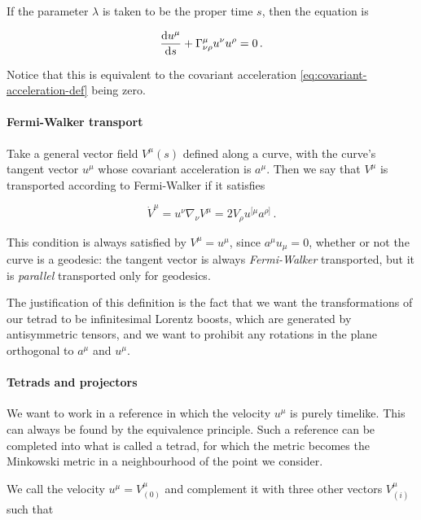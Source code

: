 \documentclass[main.tex]{subfiles}
\begin{document}
If the parameter $\lambda$ is taken to be the proper time $s$, then the equation is

\begin{equation}
    \dv{u^\mu}{s} + \Gamma^\mu _{\nu\rho} u^\nu u^\rho = 0 \,.
\end{equation}

Notice that this is equivalent to the covariant acceleration \eqref{eq:covariant-acceleration-def} being zero.

\paragraph{Fermi-Walker transport}

Take a general vector field \(V ^{\mu} (s)\) defined along a curve, with the curve's tangent vector \(u^\mu\) whose covariant acceleration is \(a^\mu\).
Then we say that \(V^\mu\) is transported according to Fermi-Walker if it satisfies

\begin{equation} \label{eq:fermi-walker-transport}
    \dot{V}^\mu  = u^\nu \nabla_\nu V^\mu
    = 2 V_\rho u^{[\mu} a^{\rho]} \,.
\end{equation}

This condition is always satisfied by \(V^\mu = u^\mu\), since \(a^\mu u_\mu = 0\), whether or not the curve is a geodesic: the tangent vector is always \emph{Fermi-Walker} transported, but it is \emph{parallel} transported only for geodesics.

The justification of this definition is the fact that we want the transformations of our tetrad to be infinitesimal Lorentz boosts, which are generated by antisymmetric tensors, and we want to prohibit any rotations in the plane orthogonal to \(a^\mu\) and \(u^\mu\).

\paragraph{Tetrads and projectors} \label{par:tetrads}

We want to work in a reference in which the velocity $u^\mu$ is purely timelike. This can always be found by the equivalence principle. Such a reference can be completed into what  is called a tetrad, for which the metric becomes the Minkowski metric in a neighbourhood of the point we consider.

We call the velocity \(u^\mu = V^\mu _{(0)}\) and complement it with three other vectors \(V^\mu_{(i)}\) such that
\end{document}
